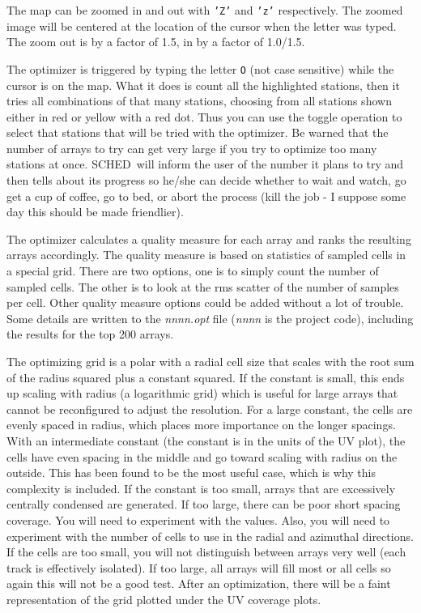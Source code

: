 \documentclass{report}
\newcommand{\schedb}{{\sc SCHED~}}
\begin{document}
The map can be zoomed in and out with {\tt 'Z'} and {\tt 'z'}
respectively.  The zoomed image will be centered at the location
of the cursor when the letter was typed.  The zoom out is by
a factor of 1.5, in by a factor of 1.0/1.5.

The optimizer is triggered by typing the letter {\tt O} (not case
sensitive) while the cursor is on the map.  What it does is count all
the highlighted stations, then it tries all combinations of that many
stations, choosing from all stations shown either in red or yellow
with a red dot.  Thus you can use the toggle operation to select that
stations that will be tried with the optimizer.  Be warned that the
number of arrays to try can get very large if you try to optimize too
many stations at once.  \schedb will inform the user of the number it
plans to try and then tells about its progress so he/she can decide
whether to wait and watch, go get a cup of coffee, go to bed, or abort
the process (kill the job - I suppose some day this should be made
friendlier).

The optimizer calculates a quality measure for each array and ranks
the resulting arrays accordingly.  The quality measure is based on
statistics of sampled cells in a special grid.  There are two options,
one is to simply count the number of sampled cells.  The other is to
look at the rms scatter of the number of samples per cell.  Other
quality measure options could be added without a lot of trouble.  Some
details are written to the {\sl nnnn.opt} file ({\sl nnnn} is the
project code), including the results for the top 200 arrays.

The optimizing grid is a polar with a radial cell size that scales
with the root sum of the radius squared plus a constant squared.  If
the constant is small, this ends up scaling with radius (a logarithmic
grid) which is useful for large arrays that cannot be reconfigured to
adjust the resolution.  For a large constant, the cells are evenly
spaced in radius, which places more importance on the longer spacings.
With an intermediate constant (the constant is in the units of the UV
plot), the cells have even spacing in the middle and go toward scaling
with radius on the outside.  This has been found to be the most useful
case, which is why this complexity is included.  If the constant is
too small, arrays that are excessively centrally condensed are
generated.  If too large, there can be poor short spacing coverage.
You will need to experiment with the values.  Also, you will need to
experiment with the number of cells to use in the radial and azimuthal
directions.  If the cells are too small, you will not distinguish
between arrays very well (each track is effectively isolated).  If too
large, all arrays will fill most or all cells so again this will not
be a good test.  After an optimization, there will be a faint
representation of the grid plotted under the UV coverage plots.
\end{document}
